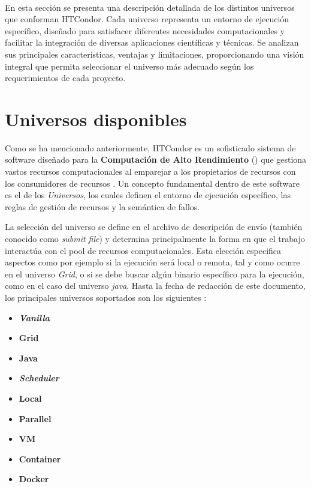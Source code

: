 \label{cap:caracterizacion-universos}
\mbox{}\\

En esta sección se presenta una descripción detallada de los distintos universos que conforman HTCondor. Cada universo representa un entorno de ejecución específico, diseñado para satisfacer diferentes necesidades computacionales y facilitar la integración de diversas aplicaciones científicas y técnicas. Se analizan sus principales características, ventajas y limitaciones, proporcionando una visión integral que permita seleccionar el universo más adecuado según los requerimientos de cada proyecto.



\section{Universos disponibles}

Como se ha mencionado anteriormente, HTCondor es un sofisticado sistema de software diseñado para la \textbf{Computación de Alto Rendimiento} (\HTC) que gestiona vastos recursos computacionales al emparejar a los propietarios de recursos con los consumidores de recursos \citep{HTCondor}. Un concepto fundamental dentro de este software es el de los \textit{Universos}, los cuales definen el entorno de ejecución específico, las reglas de gestión de recursos y la semántica de fallos.

La selección del universo se define en el archivo de descripción de envío (también conocido como \textit{submit file}) y determina principalmente la forma en que el trabajo interactúa con el pool de recursos computacionales. Esta elección especifica aspectos como por ejemplo si la ejecución será local o remota, tal y como ocurre en el universo \textit{Grid}, o si se debe buscar algún binario específico para la ejecución, como en el caso del universo \textit{java}. Hasta la fecha de redacción de este documento, los principales universos soportados son los siguientes \citep{HTCondor-choosing-universe}:

\begin{itemize}
	\item \textbf{\textit{Vanilla}}
	\item \textbf{Grid}
	\item \textbf{Java}
	\item \textbf{\textit{Scheduler}}
	\item \textbf{Local}
	\item \textbf{Parallel}
	\item \textbf{VM}
	\item \textbf{Container}
	\item \textbf{Docker}
\end{itemize}

